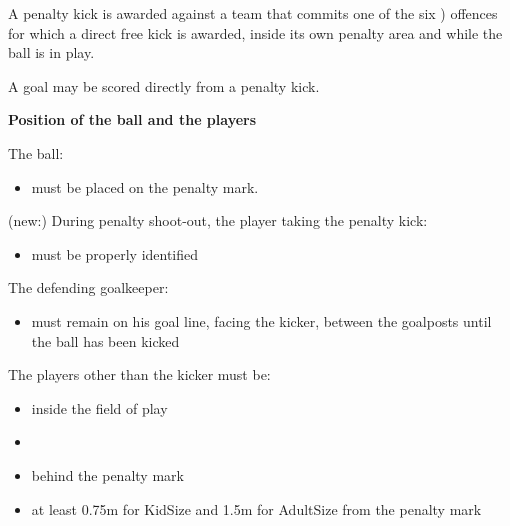 \clearpage
\sffamily
{\bfseries \color[rgb]{0.4,0.4,0.4}{Law 14 -- The Penalty Kick}}
{}

\bigskip
A penalty kick is awarded against a team that commits one of the six
) offences for which a direct free kick is awarded,
inside its own penalty area and while the ball is in play.

\bigskip

A goal may be scored directly from a penalty kick.

\bigskip


\bigskip

{\bfseries Position of the ball and the players }

\headlinebox

The ball:

\begin{itemize}
\item must be placed on the penalty mark.
\end{itemize}

(new:) During penalty shoot-out, the player taking the penalty kick:

\begin{itemize}
\item must be properly identified
\end{itemize}

The defending goalkeeper:

\begin{itemize}
\item must remain on his goal line, facing the kicker, between the goalposts until the ball has been kicked 
\end{itemize}

The players other than the kicker must be:

\bigskip
\begin{itemize}
\item inside the field of play
\item {}
\item behind the penalty mark
\item at least 0.75m for KidSize  and 1.5m for AdultSize from the
      penalty mark 
\end{itemize}

